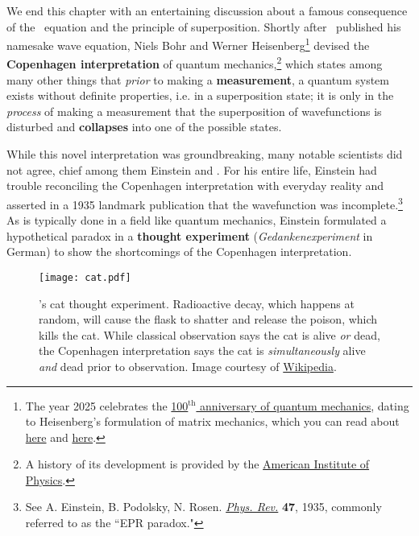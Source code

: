 We end this chapter with an entertaining discussion about a famous consequence of the \Sch\ equation and the principle of superposition. 
Shortly after \Sch\ published his namesake wave equation, Niels Bohr and Werner Heisenberg\footnote{The year 2025 celebrates the \href{https://quantum2025.org/}{100$^{\text{th}}$ anniversary of quantum mechanics}, dating to Heisenberg's formulation of matrix mechanics, which you can read about \href{https://www.aps.org/apsnews/2025/07/werner-heisenberg-pioneers-quantum-mechanics}{here} and \href{https://home.cern/news/news/physics/century-quantum-mechanics}{here}.} devised the \textbf{Copenhagen interpretation} of quantum mechanics,\footnote{A history of its development is provided by the \href{https://history.aip.org/exhibits/heisenberg/triumph.html}{American Institute of Physics}.} which states among many other things that \emph{prior} to making a \textbf{measurement}, a quantum system exists without definite properties, i.e. in a superposition state; 
it is only in the \emph{process} of making a measurement that the superposition of wavefunctions is disturbed and \textbf{collapses} into one of the possible states. 

While this novel interpretation was groundbreaking, many notable scientists did not agree, chief among them Einstein and \Sch. 
For his entire life, Einstein had trouble reconciling the Copenhagen interpretation with everyday reality and asserted in a 1935 landmark publication that the wavefunction was incomplete.\footnote{See A. Einstein, B. Podolsky, N. Rosen. \href{https://journals.aps.org/pr/abstract/10.1103/PhysRev.47.777}{\emph{Phys. Rev.}} \textbf{47}, 1935, commonly referred to as the ``EPR paradox."} 
As is typically done in a field like quantum mechanics, Einstein formulated a hypothetical paradox in a \textbf{thought experiment} (\emph{Gedankenexperiment} in German) to show the shortcomings of the Copenhagen interpretation.

\begin{figure}[!h]
	\centering
	\texttt{[image: cat.pdf]}
	\caption{\Sch's cat thought experiment. 
	Radioactive decay, which happens at random, will cause the flask to shatter and release the poison, which kills the cat. 
	While classical observation says the cat is alive \emph{or} dead, the Copenhagen interpretation says the cat is \emph{simultaneously} alive \emph{and} dead prior to observation. 
	Image courtesy of \href{https://en.wikipedia.org/wiki/Schrödinger\%27s_cat}{Wikipedia}.}
	\label{fig:cat}
\end{figure}


